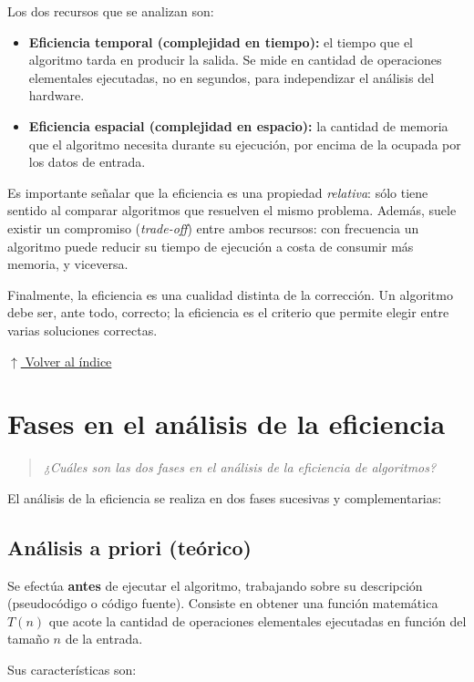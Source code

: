 \documentclass[12pt]{article}
\newcommand{\volverindice}{%
    \vspace{1em}%
    \begin{flushright}%
        \hyperlink{indice}{\small $\uparrow$ Volver al índice}%
    \end{flushright}%
}
\newcommand{\enunciado}[1]{%
    \begin{quote}
        \itshape #1
    \end{quote}
}
\begin{document}
Los dos recursos que se analizan son:

\begin{itemize}[leftmargin=2em]
    \item \textbf{Eficiencia temporal (complejidad en tiempo):} el tiempo que el algoritmo tarda en producir la salida. Se mide en cantidad de operaciones elementales ejecutadas, no en segundos, para independizar el análisis del hardware.
    \item \textbf{Eficiencia espacial (complejidad en espacio):} la cantidad de memoria que el algoritmo necesita durante su ejecución, por encima de la ocupada por los datos de entrada.
\end{itemize}

Es importante señalar que la eficiencia es una propiedad \emph{relativa}: sólo tiene sentido al comparar algoritmos que resuelven el mismo problema. Además, suele existir un compromiso (\emph{trade-off}) entre ambos recursos: con frecuencia un algoritmo puede reducir su tiempo de ejecución a costa de consumir más memoria, y viceversa.

Finalmente, la eficiencia es una cualidad distinta de la corrección. Un algoritmo debe ser, ante todo, correcto; la eficiencia es el criterio que permite elegir entre varias soluciones correctas.

\volverindice
\newpage


\section{Fases en el análisis de la eficiencia}

\enunciado{¿Cuáles son las dos fases en el análisis de la eficiencia de algoritmos?}

El análisis de la eficiencia se realiza en dos fases sucesivas y complementarias:

\subsection{Análisis a priori (teórico)}

Se efectúa \textbf{antes} de ejecutar el algoritmo, trabajando sobre su descripción (pseudocódigo o código fuente). Consiste en obtener una función matemática $T(n)$ que acote la cantidad de operaciones elementales ejecutadas en función del tamaño $n$ de la entrada.

Sus características son:
\end{document}
